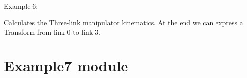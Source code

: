 \documentclass[letterpaper,10pt,english,openany,oneside]{sphinxmanual}
\begin{document}

\begin{fulllineitems}
\label{\detokenize{MatrixManipulationSymbolic:MatrixManipulationSymbolic.main}}
Example 6:

Calculates the Three-link manipulator kinematics.
At the end we can express a Transform from link 0 to link 3.

\end{fulllineitems}



\chapter{Example7 module}
\label{\detokenize{Example7:example7-module}}\label{\detokenize{Example7::doc}}
%
\end{document}
